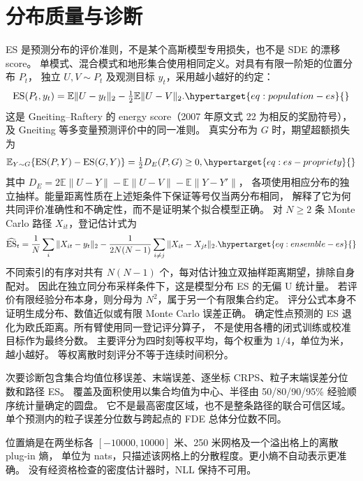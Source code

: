 \section{分布质量与诊断}
ES 是预测分布的评价准则，不是某个高斯模型专用损失，也不是 SDE 的漂移 score。
单模式、混合模式和地形集合使用相同定义。对具有有限一阶矩的位置分布 \(P_t\)，
独立 \(U,V\sim P_t\) 及观测目标 \(y_t\)，采用越小越好的约定：
\begin{equation}
\ES(P_t,y_t)=\mathbb E\|U-y_t\|_2-\tfrac12\mathbb E\|U-V\|_2.
\label{eq:population-es}\hypertarget{eq:population-es}{}
\end{equation}
这是 Gneiting--Raftery 的 energy score（2007 年原文式 22 为相反的奖励符号），
及 Gneiting 等多变量预测评价中的同一准则\cite{gneiting2007,gneiting2008}。
真实分布为 \(G\) 时，期望超额损失为
\begin{equation}
\mathbb E_{Y\sim G}\{\ES(P,Y)-\ES(G,Y)\}=\tfrac12D_E(P,G)\geq0,
\label{eq:es-propriety}\hypertarget{eq:es-propriety}{}
\end{equation}
其中 \(D_E=2\mathbb E\|U-Y\|-\mathbb E\|U-V\|-\mathbb E\|Y-Y'\|\)，
各项使用相应分布的独立抽样。能量距离性质在上述矩条件下保证等号仅当两分布相同，
解释了它为何共同评价准确性和不确定性，而不是证明某个拟合模型正确。
对 \(N\geq2\) 条 Monte Carlo 路径 \(X_{it}\)，登记估计式为
\begin{equation}
\widehat{\ES}_t=\frac1N\sum_i\|X_{it}-y_t\|_2
-\frac{1}{2N(N-1)}\sum_{i\ne j}\|X_{it}-X_{jt}\|_2.
\label{eq:ensemble-es}\hypertarget{eq:ensemble-es}{}
\end{equation}
不同索引的有序对共有 \(N(N-1)\) 个，每对估计独立双抽样距离期望，排除自身配对。
因此在独立同分布采样条件下，这是模型分布 ES 的无偏 U 统计量。
若评价有限经验分布本身，则分母为 \(N^2\)，属于另一个有限集合约定。
评分公式本身不证明生成分布、数值近似或有限 Monte Carlo 误差正确。
确定性点预测的 ES 退化为欧氏距离。所有臂使用同一登记评分算子，
不是使用各槽的闭式训练或校准目标作为最终分数。
主要评分为四时刻等权平均，每个权重为 \(1/4\)，单位为米，越小越好。
等权离散时刻评分不等于连续时间积分。

次要诊断包含集合均值位移误差、末端误差、逐坐标 CRPS、粒子末端误差分位数和路径 ES。
覆盖及面积使用以集合均值为中心、半径由 50/80/90/95\% 经验顺序统计量确定的圆盘。
它不是最高密度区域，也不是整条路径的联合可信区域。
单个预测内的粒子误差分位数与跨起点的 FDE 总体分位数不同。

位置熵是在两坐标各 \([-10000,10000]\) 米、250 米网格及一个溢出格上的离散 plug-in 熵，
单位为 nats，只描述该网格上的分散程度。更小熵不自动表示更准确。
没有经资格检查的密度估计器时，NLL 保持不可用。

